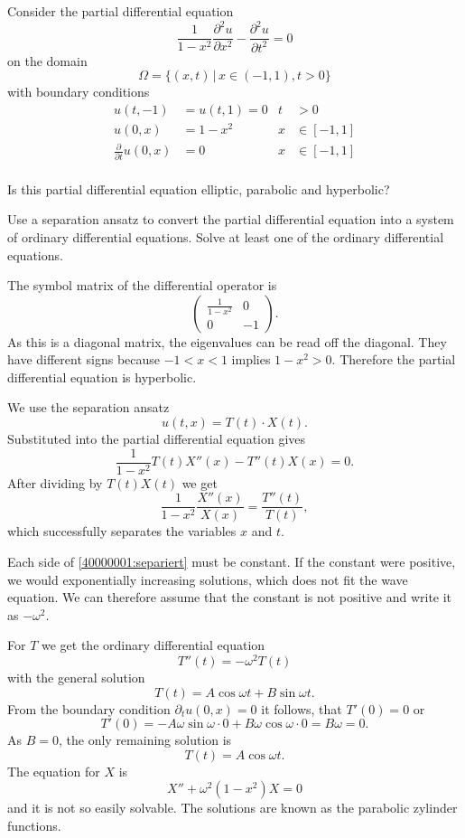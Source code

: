 Consider the partial differential equation
\[
\frac1{1-x^2}\frac{\partial^2 u}{\partial x^2}
-
\frac{\partial^2 u}{\partial t^2}=0
\]
on the domain
\[
\Omega=\{(x,t)\,|\, x\in (-1,1), t>0\}
\]
with boundary conditions
\begin{align*}
u(t,-1)&=u(t,1)=0&t&>0\\
u(0,x)&=1-x^2&x&\in[-1,1]\\
\frac{\partial}{\partial t}u(0,x)&=0&x&\in[-1,1]\\
\end{align*}
\begin{teilaufgaben}
\item
Is this partial differential equation elliptic, parabolic and hyperbolic?
\item
Use a separation ansatz to convert the partial differential equation
into a system of ordinary differential equations.
Solve at least one of the ordinary differential equations.
\end{teilaufgaben}

\begin{loesung}
\begin{teilaufgaben}
\item
The symbol matrix of the differential operator is
\[
\begin{pmatrix}
\frac1{1-x^2}&0\\0&-1
\end{pmatrix}.
\]
As this is a diagonal matrix, the eigenvalues can be read off the diagonal.
They have different signs because $-1<x<1$ implies $1-x^2 >0$.
Therefore the partial differential equation is hyperbolic.
\item
We use the separation ansatz
\[
u(t,x)=T(t)\cdot X(t).
\]
Substituted into the partial differential equation gives
\[
\frac1{1-x^2}T(t)X''(x)-T''(t)X(x)=0.
\]
After dividing by 
$T(t)X(t)$ we get
\begin{equation}
\frac1{1-x^2}\frac{X''(x)}{X(x)}=\frac{T''(t)}{T(t)},
\label{40000001:separiert}
\end{equation}
which successfully separates the variables $x$ and $t$.

Each side of \eqref{40000001:separiert} must be constant.
If the constant were positive, we would exponentially increasing
solutions, which does not fit the wave equation.
We can therefore assume that the constant is not positive
and write it as $-\omega^2$.

For $T$ we get the ordinary differential equation
\[
T''(t)=-\omega^2 T(t)
\]
with the general solution
\[
T(t)=A\cos\omega t+B\sin\omega t.
\]
From the boundary condition $\partial_t u(0,x)=0$ it follows, that
$T'(0)=0$ or
\[
T'(0)=-A\omega\sin\omega \cdot 0+B\omega\cos\omega\cdot 0=B\omega=0.
\]
As $B=0$, the only remaining solution is
\[
T(t)=A\cos\omega t.
\]
The equation for $X$ is
\[
X''+\omega^2(1-x^2)X=0
\]
and it is not so easily solvable.
The solutions are known as the parabolic zylinder functions. 
\qedhere
\end{teilaufgaben}
\end{loesung}


